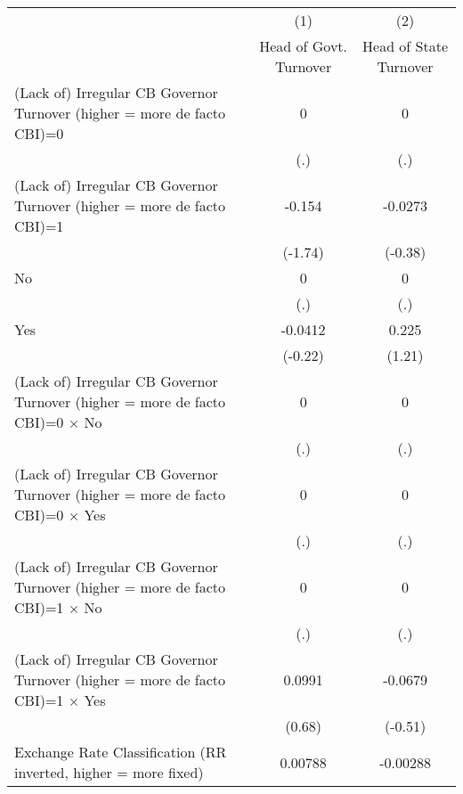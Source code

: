 {
\def\sym#1{\ifmmode^{#1}\else\(^{#1}\)\fi}
\begin{tabular*}{\linewidth}{@{\hskip\tabcolsep\extracolsep\fill}l*{2}{c}}
\toprule
                &\multicolumn{1}{c}{(1)}&\multicolumn{1}{c}{(2)}\\
                &\multicolumn{1}{c}{Head of Govt. Turnover}&\multicolumn{1}{c}{Head of State Turnover}\\
\midrule
(Lack of) Irregular CB Governor Turnover (higher = more de facto CBI)=0&        0         &        0         \\
                &      (.)         &      (.)         \\
\addlinespace
(Lack of) Irregular CB Governor Turnover (higher = more de facto CBI)=1&   -0.154         &  -0.0273         \\
                &  (-1.74)         &  (-0.38)         \\
\addlinespace
No              &        0         &        0         \\
                &      (.)         &      (.)         \\
\addlinespace
Yes             &  -0.0412         &    0.225         \\
                &  (-0.22)         &   (1.21)         \\
\addlinespace
(Lack of) Irregular CB Governor Turnover (higher = more de facto CBI)=0 $\times$ No&        0         &        0         \\
                &      (.)         &      (.)         \\
\addlinespace
(Lack of) Irregular CB Governor Turnover (higher = more de facto CBI)=0 $\times$ Yes&        0         &        0         \\
                &      (.)         &      (.)         \\
\addlinespace
(Lack of) Irregular CB Governor Turnover (higher = more de facto CBI)=1 $\times$ No&        0         &        0         \\
                &      (.)         &      (.)         \\
\addlinespace
(Lack of) Irregular CB Governor Turnover (higher = more de facto CBI)=1 $\times$ Yes&   0.0991         &  -0.0679         \\
                &   (0.68)         &  (-0.51)         \\
\addlinespace
Exchange Rate Classification (RR inverted, higher = more fixed)&  0.00788         & -0.00288         \\

\end{tabular*}}
